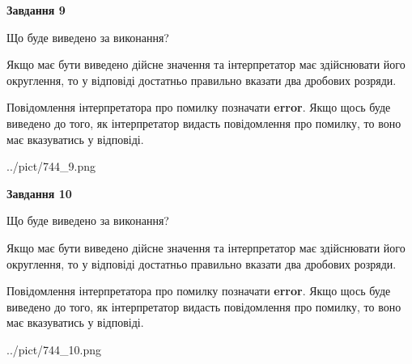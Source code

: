 \documentclass[12pt, ukrainian]{article}
\begin{document}
{\begin {Large}
{\begin {center}\textbf{Завдання 9}\end {center}}\par
Що буде виведено за виконання? \par

Якщо має бути виведено дійсне значення та інтерпретатор має здійснювати його округлення, 
то у відповіді достатньо правильно вказати два дробових розряди.

Повідомлення інтерпретатора про помилку позначати \textbf{error}.
Якщо щось буде виведено до того, як інтерпретатор видасть повідомлення про помилку, 
то воно має вказуватись у відповіді. \par

\begin{center}
	{../pict/744_9.png}
\end{center}
\newpage

{\begin {center}\textbf{Завдання 10}\end {center}}\par
Що буде виведено за виконання? \par

Якщо має бути виведено дійсне значення та інтерпретатор має здійснювати його округлення, 
то у відповіді достатньо правильно вказати два дробових розряди.

Повідомлення інтерпретатора про помилку позначати \textbf{error}.
Якщо щось буде виведено до того, як інтерпретатор видасть повідомлення про помилку, 
то воно має вказуватись у відповіді. \par

\begin{center}
	{../pict/744_10.png}
\end{center}
\newpage

\end {Large}}
\end{document}

